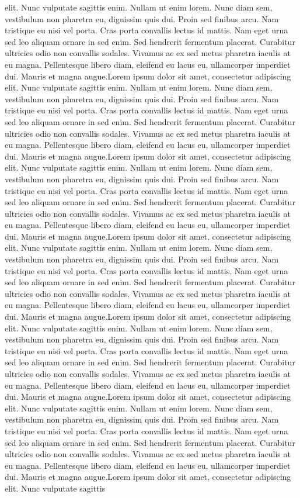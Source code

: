 \documentclass{book}
\begin{document}
elit. Nunc vulputate sagittis enim. Nullam ut enim lorem. Nunc diam sem, vestibulum non pharetra eu, dignissim quis dui. Proin sed finibus arcu. Nam tristique eu nisi vel porta. Cras porta convallis lectus id mattis. Nam eget urna sed leo aliquam ornare in sed enim. Sed hendrerit fermentum placerat. Curabitur ultricies odio non convallis sodales. Vivamus ac ex sed metus pharetra iaculis at eu magna. Pellentesque libero diam, eleifend eu lacus eu, ullamcorper imperdiet dui. Mauris et magna augue.Lorem ipsum dolor sit amet, consectetur adipiscing elit. Nunc vulputate sagittis enim. Nullam ut enim lorem. Nunc diam sem, vestibulum non pharetra eu, dignissim quis dui. Proin sed finibus arcu. Nam tristique eu nisi vel porta. Cras porta convallis lectus id mattis. Nam eget urna sed leo aliquam ornare in sed enim. Sed hendrerit fermentum placerat. Curabitur ultricies odio non convallis sodales. Vivamus ac ex sed metus pharetra iaculis at eu magna. Pellentesque libero diam, eleifend eu lacus eu, ullamcorper imperdiet dui. Mauris et magna augue.Lorem ipsum dolor sit amet, consectetur adipiscing elit. Nunc vulputate sagittis enim. Nullam ut enim lorem. Nunc diam sem, vestibulum non pharetra eu, dignissim quis dui. Proin sed finibus arcu. Nam tristique eu nisi vel porta. Cras porta convallis lectus id mattis. Nam eget urna sed leo aliquam ornare in sed enim. Sed hendrerit fermentum placerat. Curabitur ultricies odio non convallis sodales. Vivamus ac ex sed metus pharetra iaculis at eu magna. Pellentesque libero diam, eleifend eu lacus eu, ullamcorper imperdiet dui. Mauris et magna augue.Lorem ipsum dolor sit amet, consectetur adipiscing elit. Nunc vulputate sagittis enim. Nullam ut enim lorem. Nunc diam sem, vestibulum non pharetra eu, dignissim quis dui. Proin sed finibus arcu. Nam tristique eu nisi vel porta. Cras porta convallis lectus id mattis. Nam eget urna sed leo aliquam ornare in sed enim. Sed hendrerit fermentum placerat. Curabitur ultricies odio non convallis sodales. Vivamus ac ex sed metus pharetra iaculis at eu magna. Pellentesque libero diam, eleifend eu lacus eu, ullamcorper imperdiet dui. Mauris et magna augue.Lorem ipsum dolor sit amet, consectetur adipiscing elit. Nunc vulputate sagittis enim. Nullam ut enim lorem. Nunc diam sem, vestibulum non pharetra eu, dignissim quis dui. Proin sed finibus arcu. Nam tristique eu nisi vel porta. Cras porta convallis lectus id mattis. Nam eget urna sed leo aliquam ornare in sed enim. Sed hendrerit fermentum placerat. Curabitur ultricies odio non convallis sodales. Vivamus ac ex sed metus pharetra iaculis at eu magna. Pellentesque libero diam, eleifend eu lacus eu, ullamcorper imperdiet dui. Mauris et magna augue.Lorem ipsum dolor sit amet, consectetur adipiscing elit. Nunc vulputate sagittis enim. Nullam ut enim lorem. Nunc diam sem, vestibulum non pharetra eu, dignissim quis dui. Proin sed finibus arcu. Nam tristique eu nisi vel porta. Cras porta convallis lectus id mattis. Nam eget urna sed leo aliquam ornare in sed enim. Sed hendrerit fermentum placerat. Curabitur ultricies odio non convallis sodales. Vivamus ac ex sed metus pharetra iaculis at eu magna. Pellentesque libero diam, eleifend eu lacus eu, ullamcorper imperdiet dui. Mauris et magna augue.Lorem ipsum dolor sit amet, consectetur adipiscing elit. Nunc vulputate sagittis 
\end{document}
